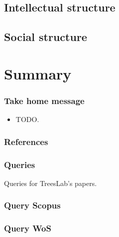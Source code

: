 \documentclass[aspectratio=169]{beamer}
\begin{document}
\subsection{Intellectual structure}
\subsection{Social structure}




\section{Summary}

\begin{frame}
  \frametitle{Take home message}
  \begin{itemize}
    \item TODO.
  \end{itemize}
\end{frame}

\begin{frame}[allowframebreaks]
  \frametitle{References}
  
  
\end{frame}

\begin{frame}
  \frametitle{Queries}
  Queries for TreesLab's papers.
\end{frame}

\begin{frame}[allowframebreaks]
  \frametitle{Query Scopus}
\end{frame}

\begin{frame}[allowframebreaks]
  \frametitle{Query WoS}
\end{frame}
\end{document}
